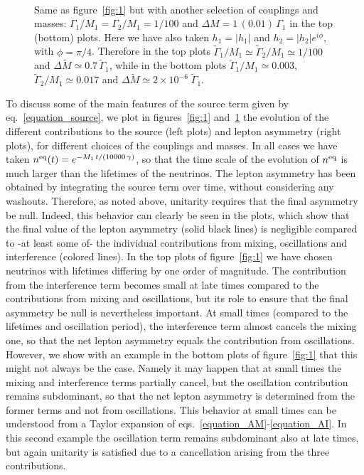 \documentclass[11pt,a4paper]{article}
\providecommand{\abs}[1]{\left\lvert #1 \right\rvert}
\providecommand{\pia}[0]{\tilde{\Gamma}_1}
\providecommand{\pib}[0]{\tilde{\Gamma}_2}
\begin{document}
\begin{figure}[!t]
\centerline{\protect\hbox{
}} 
\caption[]{
Same as figure~\ref{fig:1} but with another selection of couplings and masses: $\Gamma_1/M_1=\Gamma_2/M_1=1/100$ and $\Delta M= 1 \, (0.01) \, \Gamma_1$ in the top (bottom) plots. Here we have also taken $h_1=\abs{h_1}$ and $h_2=\abs{h_2} e^{i \phi}$, with $\phi=\pi/4$. Therefore in the top plots $\pia/M_1\simeq \pib/M_1 \simeq 1/100$ and $\Delta {\tilde M} \simeq 0.7 \,\pia$, while in the bottom plots $\pia/M_1\simeq 0.003$, $\pib/M_1 \simeq 0.017$ and $\Delta {\tilde M} \simeq 2 \times 10^{-6} \;\pia$.
} 
\label{fig:2}
\end{figure}

To discuss some of the main features of the source term given by eq.~\eqref{equation_source}, we plot in figures~\ref{fig:1} and~\ref{fig:2} the evolution of the different contributions to the source (left plots) and lepton asymmetry (right plots), for different choices of the couplings and masses.  In all cases we have taken $n^{\rm eq}(t)=e^{-M_1 \, t/(10000 \, \gamma)}$, so that the time scale of the evolution of $n^{\rm eq}$ is much larger than the lifetimes of the neutrinos. The lepton asymmetry has been obtained by integrating the source term over time, without considering any washouts. Therefore, as noted above, unitarity requires that the final asymmetry be null. Indeed, this behavior can clearly be seen in the plots, which show that the final value of the lepton asymmetry (solid black lines) is negligible compared to -at least some of- the individual contributions from mixing, oscillations and interference (colored lines). In the top plots of figure~\ref{fig:1} we have chosen neutrinos with lifetimes differing by one order of magnitude. The contribution from the interference term becomes small at late times compared to the contributions from mixing and oscillations, but its role to ensure that the final asymmetry be null is nevertheless important. At small times (compared to the lifetimes and oscillation period), the interference term almost cancels the mixing one, so that the net lepton asymmetry equals the contribution from oscillations. However, we show with an example in the bottom plots of figure~\ref{fig:1} that this might not always be the case. Namely it may happen that at small times the mixing and interference terms partially cancel, but the oscillation contribution remains subdominant, so that the net lepton asymmetry is determined from the former terms and not from oscillations. This behavior at small times can be understood from a Taylor expansion of eqs.~\eqref{equation_AM}-\eqref{equation_AI}. In this second example the oscillation term remains subdominant also at late times, but again unitarity is satisfied due to a cancellation arising from the three contributions.   
\end{document}
